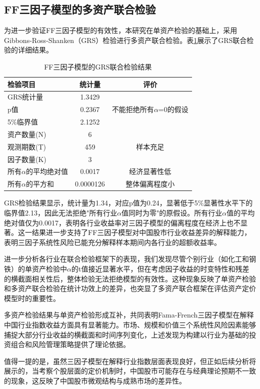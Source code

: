 \documentclass[12pt, a4paper]{article}
\begin{document}
\subsection{FF三因子模型的多资产联合检验}

为进一步验证FF三因子模型的有效性，本研究在单资产检验的基础上，采用Gibbons-Ross-Shanken（GRS）检验进行多资产联合检验。表\ref{tab:grs_test}展示了GRS联合检验的详细结果。

\begin{table}[htbp]
\centering
\caption{FF三因子模型的GRS联合检验结果}
\label{tab:grs_test}
\begin{tabular}{lcc}
\toprule
检验项目 & 统计量 & 评价 \\
\midrule
GRS统计量 & 1.3429 & \multirow{3}{*}{不能拒绝所有$\alpha$=0的假设} \\
p值 & 0.2367 & \\
5\%临界值 & 2.1252 & \\
\midrule
资产数量(N) & 6 & \multirow{3}{*}{样本充足} \\
观测期数(T) & 459 & \\
因子数量(K) & 3 & \\
\midrule
所有$\alpha$的平均绝对值 & 0.0017 & 经济显著性低 \\
所有$\alpha$的平方和 & 0.0000126 & 整体偏离程度小 \\
\bottomrule
\end{tabular}
\end{table}

GRS检验结果显示，统计量为1.34，对应p值为0.24，显著低于5\%显著性水平下的临界值2.13，因此无法拒绝"所有行业$\alpha$值同时为零"的原假设。所有行业$\alpha$值的平均绝对值仅为0.0017，表明各行业收益率对三因子模型的偏离程度在经济上也不显著。这一结果进一步支持了FF三因子模型对中国股市行业收益差异的解释能力，表明三因子系统性风险已能充分解释样本期间内各行业的超额收益率。

进一步分析各行业在联合检验框架下的表现，我们发现尽管个别行业（如化工和钢铁）的单资产检验中$\alpha$的t值接近显著水平，但在考虑因子收益的时变特性和残差的横截面相关性后，整体检验无法拒绝模型的有效性。这种现象反映了单资产检验和多资产联合检验在统计功效上的差异，也突显了多资产联合框架在评估资产定价模型时的重要性。

多资产检验结果与单资产检验形成互补，共同表明Fama-French三因子模型在解释中国行业指数收益方面具有显著能力。市场、规模和价值三个系统性风险因素能够捕捉大部分行业收益的横截面和时间序列变化，上述发现为构建以行业为基础的投资组合和风险管理策略提供了理论依据。

值得一提的是，虽然三因子模型在解释行业指数层面表现良好，但正如后续分析将展示的，当考察个股层面的定价机制时，中国股市可能存在与经典理论预期不一致的现象，这反映了中国股市微观结构与成熟市场的差异性。
\end{document}
